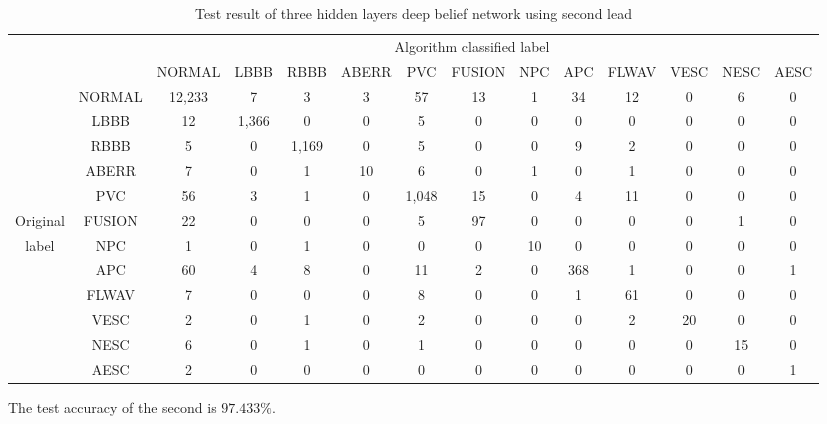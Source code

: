 \documentclass{bmcart}
\begin{document}
\begin{table}[]
\small
\begin{center}
\begin{threeparttable}
\caption{Test result of three hidden layers deep belief network using second lead}
\label{table3}
\begin{tabular}{cccccccccccccc}
\hline
\multicolumn{9}{r}{Algorithm classified label} \\
\cline{3-14}
		 &      & NORMAL & LBBB & RBBB & ABERR & PVC & FUSION & NPC & APC & FLWAV & VESC & NESC & AESC\\
\hline
 		 & NORMAL & 12,233& 7   &  3   &  3   &  57  &  13   &	1   &  34 &   12  &   0  &  6  &  0 \\
	     & LBBB   &  12   & 1,366&  0  &  0   &  5   &  0    &  0   &  0  &   0   &   0  &  0  &  0 \\
		 & RBBB   &  5    &  0  & 1,169&  0   &  5   &  0    &	0   &  9  &   2   &   0  &  0  &  0 \\
		 & ABERR  &  7    &  0  &  1   &  10  &  6   &  0    &	1   &  0  &   1   &   0  &  0  &  0 \\
		 & PVC    &  56   &  3  &  1   &  0   & 1,048&  15   &	0   &  4  &   11  &   0  &  0  &  0 \\
Original & FUSION &	 22   &  0  &  0   &  0   &  5   &   97  &	0   &  0  &   0   &   0  &  1  &  0 \\
label    & NPC    &	 1    &  0  &  1   &  0   &  0   &  0    &	10  &  0  &   0   &   0  &  0  &  0 \\
		 & APC    &	 60   &  4  &  8   &  0   &  11  &  2    &	0   &  368&   1   &   0  &  0  &  1 \\
		 & FLWAV  &	 7    &  0  &  0   &  0   &  8   &  0    &	0   &  1  &   61  &   0  &  0  &  0 \\
		 & VESC   &	 2    &  0  &  1   &  0   &  2   &  0    &	0   &  0  &   2   &  20  &  0  &  0 \\
		 & NESC   &	 6    &  0  &  1   &  0   &  1   &  0    &	0   &  0  &   0   &   0  &  15 &  0 \\
		 & AESC   &	 2    &  0  &  0   &  0   &  0   &  0    &	0   &  0  &   0   &   0  &  0  &  1 \\
\hline
\end{tabular}
\begin{tablenotes}
\item The test accuracy of the second is $97.433\%$.
\end{tablenotes}
\end{threeparttable}
\end{center}
\end{table}
\end{document}
